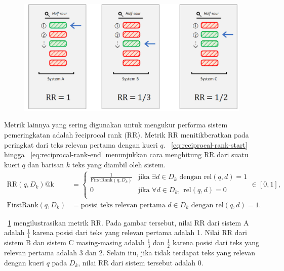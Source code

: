         \begin{figure}[!ht]
            \centering
            \includegraphics[width=1\textwidth]{assets/pics/rr.png}
            \label{fig:reciprocal-rank}
        \end{figure}
        Metrik lainnya yang sering digunakan untuk mengukur performa sistem pemeringkatan adalah \f{reciprocal rank} (RR). Metrik RR menitikberatkan pada peringkat dari teks relevan pertama dengan kueri $q$. \equ~\ref{eq:reciprocal-rank-start} hingga \equ~\ref{eq:reciprocal-rank-end} menunjukkan cara menghitung RR dari suatu kueri $q$ dan barisan $k$ teks yang diambil oleh sistem.
        \begin{align}
            \text{RR}(q, D_k)\text{@k} &= \begin{cases}
                \label{eq:reciprocal-rank-start}
                \frac{1}{\text{FirstRank}(q, D_k)} & \text{jika } \exists d \in D_k \text{ dengan } \text{rel}(q, d) = 1 \\        
                0 & \text{jika } \forall d \in D_k, \text{ rel}(q, d) = 0 \\
                \end{cases} \in [0, 1], \\
                \label{eq:reciprocal-rank-end}
                \text{FirstRank}(q,D_k) &= \text{posisi teks relevan pertama } d\in D_k \text{ dengan } \text{rel}(q, d) = 1.
        \end{align}

        \pic~\ref{fig:reciprocal-rank} mengilustrasikan metrik RR. Pada gambar tersebut, nilai RR dari sistem A adalah  $\frac{1}{1}$ karena posisi dari teks yang relevan pertama adalah 1. Nilai RR dari sistem B dan sistem C masing-masing adalah   $\frac{1}{3}$ dan  $\frac{1}{2}$ karena posisi dari teks yang relevan pertama adalah 3 dan 2. Selain itu, jika tidak terdapat teks yang relevan dengan kueri $q$ pada $D_k$, nilai RR dari sistem tersebut adalah 0. 

